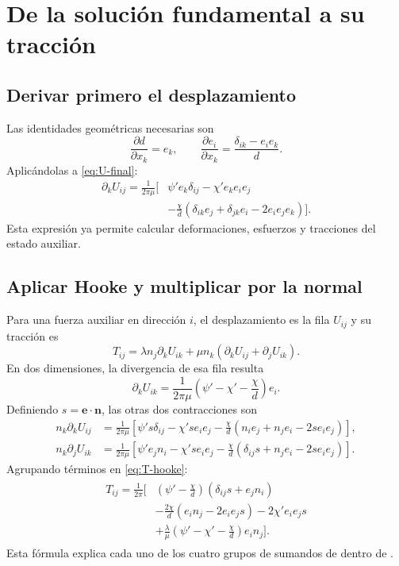 \documentclass[11pt,a4paper]{report}
\numberwithin{equation}{chapter}
\newcommand{\vect}[1]{\bm{#1}}
\DeclareRobustCommand{\code}[1]{\texttt{\detokenize{#1}}}
\begin{document}
\chapter{De la soluci\'on fundamental a su tracci\'on}
\label{ch:traccion}

\section{Derivar primero el desplazamiento}
Las identidades geom\'etricas necesarias son
\begin{equation}
 \frac{\partial d}{\partial x_k}=e_k,\qquad
 \frac{\partial e_i}{\partial x_k}
       =\frac{\delta_{ik}-e_ie_k}{d}.
\end{equation}
Aplic\'andolas a \eqref{eq:U-final}:
\begin{align}
 \partial_kU_{ij}=\frac{1}{2\pi\mu}\bigg[
 &\psi'e_k\delta_{ij}-\chi'e_ke_ie_j\\
 &-\frac{\chi}{d}
   \left(\delta_{ik}e_j+\delta_{jk}e_i-2e_ie_je_k\right)\bigg].
 \label{eq:grad-U}
\end{align}
Esta expresi\'on ya permite calcular deformaciones, esfuerzos y
tracciones del estado auxiliar.

\section{Aplicar Hooke y multiplicar por la normal}
Para una fuerza auxiliar en direcci\'on $i$, el desplazamiento es la
fila $U_{ij}$ y su tracci\'on es
\begin{equation}
 T_{ij}=\lambda n_j\partial_kU_{ik}
      +\mu n_k(\partial_kU_{ij}+\partial_jU_{ik}).
 \label{eq:T-hooke}
\end{equation}
En dos dimensiones, la divergencia de esa fila resulta
\begin{equation}
 \partial_kU_{ik}=\frac{1}{2\pi\mu}
           \left(\psi'-\chi'-\frac{\chi}{d}\right)e_i.
\end{equation}
Definiendo $s=\vect e\cdot\vect n$, las otras dos contracciones son
\begin{align}
 n_k\partial_kU_{ij}
 &=\frac{1}{2\pi\mu}\left[
 \psi's\delta_{ij}-\chi'se_ie_j
 -\frac{\chi}{d}(n_ie_j+n_je_i-2se_ie_j)\right],\\
 n_k\partial_jU_{ik}
 &=\frac{1}{2\pi\mu}\left[
 \psi'e_jn_i-\chi'se_ie_j
 -\frac{\chi}{d}(\delta_{ij}s+n_je_i-2se_ie_j)\right].
\end{align}
Agrupando t\'erminos en \eqref{eq:T-hooke}:
\begin{align}
 \boxed{\begin{aligned}
 T_{ij}=\frac1{2\pi}\bigg[&
 \left(\psi'-\frac{\chi}{d}\right)(\delta_{ij}s+e_jn_i)\\
 &-\frac{2\chi}{d}(e_in_j-2e_ie_js)-2\chi'e_ie_js\\
 &+\frac{\lambda}{\mu}
    \left(\psi'-\chi'-\frac{\chi}{d}\right)e_in_j\bigg].
 \end{aligned}}
 \label{eq:T-final}
\end{align}
Esta f\'ormula explica cada uno de los cuatro grupos de sumandos de
\code{T} dentro de \code{kernels}.
\end{document}
